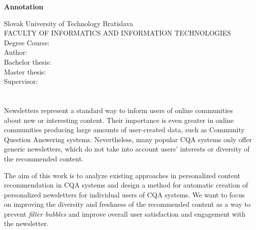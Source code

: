 \newpage
\thispagestyle{plain}
\begin{center}
\begin{Large}
\textbf{Annotation} \\
\end{Large}
\end{center}
Slovak University of Technology Bratislava \\
FACULTY OF INFORMATICS AND INFORMATION TECHNOLOGIES \\
\noindent
Degree Course: \ProgramEN \\
\noindent
Author: \Author \\
{
	{Bachelor thesis: }\TitleEN \\
}
{
	{Master thesis: }\TitleEN \\
}
Supervisor: \Supervisor \\
\MonthEN \Year \\
\noindent
\\
Newsletters represent a standard way to inform users of online communities about new or interesting content.
Their importance is even greater in online communities producing large amounts of user-created data, such as
Community Question Answering systems.
Nevertheless, many popular CQA systems only offer generic newsletters, which do not take into account users’ interests
or diversity of the recommended content.

The aim of this work is to analyze existing approaches in personalized content recommendation in CQA systems and design a method for automatic
creation of personalized newsletters for individual users of CQA systems. We want to focus on improving the diversity and freshness of the
recommended content as a way to prevent \emph{filter bubbles} and improve overall user satisfaction and engagement with the newsletter.
